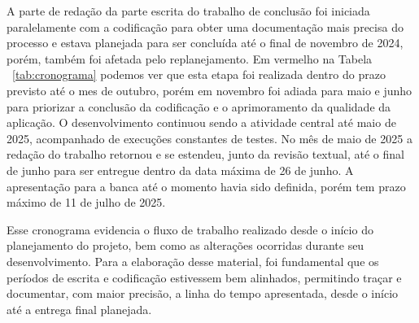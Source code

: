 A parte de redação da parte escrita do trabalho de conclusão foi iniciada 
paralelamente com a codificação para obter uma documentação mais precisa 
do processo e estava planejada para ser concluída até o final de novembro 
de 2024, porém, também foi afetada pelo replanejamento. Em vermelho na 
Tabela ~\ref{tab:cronograma} podemos ver que esta etapa foi realizada dentro 
do prazo previsto até o mes de outubro, porém em novembro foi adiada para maio 
e junho para priorizar a conclusão da codificação e o aprimoramento da qualidade 
da aplicação.
O desenvolvimento continuou sendo a atividade central até maio de 2025, acompanhado 
de execuções constantes de testes. No mês de maio de 2025 a redação do trabalho 
retornou e se estendeu, junto da revisão textual, até o final de junho para ser 
entregue dentro da data máxima de 26 de junho. A apresentação para a banca até o 
momento havia sido definida, porém tem prazo máximo de 11 de julho de 2025.

Esse cronograma evidencia o fluxo de trabalho realizado desde o início do 
planejamento do projeto, bem como as alterações ocorridas durante seu desenvolvimento. 
Para a elaboração desse material, foi fundamental que os períodos de escrita e codificação 
estivessem bem alinhados, permitindo traçar e documentar, com maior precisão, a linha do 
tempo apresentada, desde o início até a entrega final planejada.


